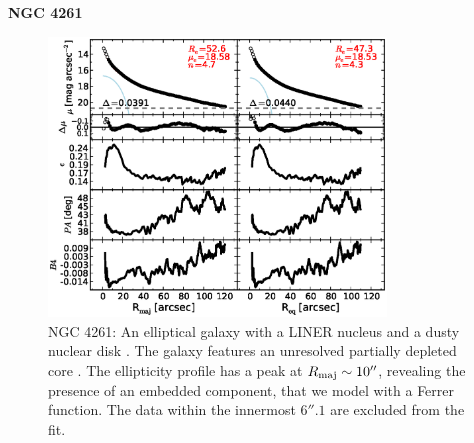\documentclass[preprint2]{emulateapj}
\newcommand{\fitfigurewidth}{0.8\textwidth}
\begin{document}
  \clearpage\newpage\noindent
  {\bf NGC 4261 \\}

  \begin{figure}[h]
  \begin{center}
  \includegraphics[width=\fitfigurewidth]{n4261_1Dfit.eps}
  \caption{NGC 4261: 
  An elliptical galaxy with a LINER nucleus \citep{veroncettyveron2006}
  and a dusty nuclear disk \citep{tran2001}.
  The galaxy features an unresolved partially depleted core \citep{rusli2013}. %
  The ellipticity profile has a peak at $R_{\rm maj} \sim 10''$, revealing the presence of an embedded component, 
  that we model with a Ferrer function.
  The data within the innermost $6''.1$ are excluded from the fit.
  }
  \end{center}
  \end{figure}
\end{document}

